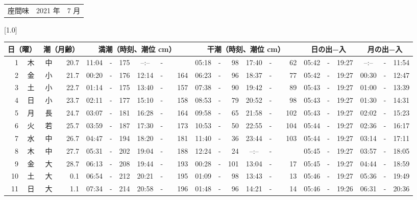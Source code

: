 \documentclass[12pt,a4j]{jsarticle}
\begin{document}
 \begin{table}[htbp]
 \begin{center}
 \begin{tabular}{lcc}
 \LARGE{座間味}  & \large{2021 年} & \large{ 7 月} \\
 \end{tabular}
 \end{center}
 \begin{center}
    \scalebox{0.7}[1.0]{
    \begin{tabular}{|rc|cr|ccrccr|ccrccr|ccc|ccc|}
    \hline
    \multicolumn{2}{|c|}{日（曜）} & \multicolumn{2}{c|}{潮（月齢）} & \multicolumn{6}{c|}{満潮（時刻、潮位 cm）} & \multicolumn{6}{c|}{干潮（時刻、潮位 cm）} & \multicolumn{3}{c|}{日の出−入} &  \multicolumn{3}{c|}{月の出−入}\\
 \hline
 1 & 木 & 中 & 20.7 &  11:04 &-& 175 &  --:-- &-&~~~~~ &  05:18 &-&  98 &  17:40 &-&  62 & 05:42 & -& 19:27 & --:-- & -& 11:54 \\
 2 & 金 & 小 & 21.7 &  00:20 &-& 176 &  12:14 &-& 164 &  06:23 &-&  96 &  18:37 &-&  77 & 05:42 & -& 19:27 & 00:30 & -& 12:47 \\
 3 & 土 & 小 & 22.7 &  01:14 &-& 175 &  13:40 &-& 157 &  07:38 &-&  90 &  19:42 &-&  89 & 05:43 & -& 19:27 & 01:00 & -& 13:39 \\
 4 & 日 & 小 & 23.7 &  02:11 &-& 177 &  15:10 &-& 158 &  08:53 &-&  79 &  20:52 &-&  98 & 05:43 & -& 19:27 & 01:30 & -& 14:31 \\
 5 & 月 & 長 & 24.7 &  03:07 &-& 181 &  16:28 &-& 164 &  09:58 &-&  65 &  21:58 &-& 102 & 05:43 & -& 19:27 & 02:02 & -& 15:23 \\
 6 & 火 & 若 & 25.7 &  03:59 &-& 187 &  17:30 &-& 173 &  10:53 &-&  50 &  22:55 &-& 104 & 05:44 & -& 19:27 & 02:36 & -& 16:17 \\
 7 & 水 & 中 & 26.7 &  04:47 &-& 194 &  18:20 &-& 181 &  11:40 &-&  36 &  23:44 &-& 103 & 05:44 & -& 19:27 & 03:14 & -& 17:11 \\
 8 & 木 & 中 & 27.7 &  05:31 &-& 202 &  19:04 &-& 188 &  12:24 &-&  24 &  --:-- &-&~~~~~ & 05:45 & -& 19:27 & 03:57 & -& 18:05 \\
 9 & 金 & 大 & 28.7 &  06:13 &-& 208 &  19:44 &-& 193 &  00:28 &-& 101 &  13:04 &-&  17 & 05:45 & -& 19:27 & 04:44 & -& 18:59 \\
10 & 土 & 大 &  0.1 &  06:54 &-& 212 &  20:21 &-& 195 &  01:09 &-&  98 &  13:43 &-&  13 & 05:46 & -& 19:27 & 05:36 & -& 19:49 \\
11 & 日 & 大 &  1.1 &  07:34 &-& 214 &  20:58 &-& 196 &  01:48 &-&  96 &  14:21 &-&  14 & 05:46 & -& 19:26 & 06:31 & -& 20:36 \\

\end{tabular}}
\end{center}
\end{table}
\end{document}
